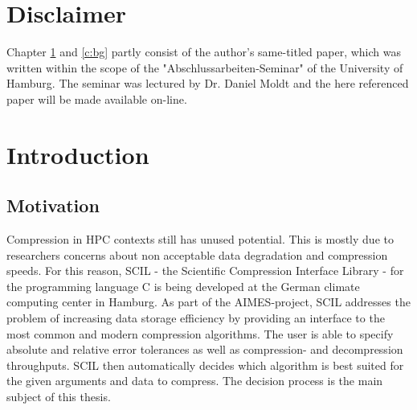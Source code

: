 \documentclass[
	12pt,
	a4paper,
	BCOR10mm,
	DIV14,
	headsepline,
]{scrreprt}
\begin{document}
\tableofcontents

\chapter*{Disclaimer}

Chapter \ref{c:intro} and \ref{c:bg} partly consist of the author's same-titled paper, which was written within the scope of the "Abschlussarbeiten-Seminar" of the University of Hamburg.
The seminar was lectured by Dr. Daniel Moldt and the here referenced paper will be made available on-line. \cite{aas} %

\chapter{Introduction}
\label{c:intro}

\section{Motivation}
\label{s:mot}


Compression in HPC contexts still has unused potential.
This is mostly due to researchers concerns about non acceptable data degradation and compression speeds. \cite{ELCC}
For this reason, SCIL - the Scientific Compression Interface Library - for the programming language C is being developed at the German climate computing center in Hamburg.
As part of the AIMES-project, SCIL addresses the problem of increasing data storage efficiency by providing an interface to the most common and modern compression algorithms. \cite{aimes}
The user is able to specify absolute and relative error tolerances as well as compression- and decompression throughputs.
SCIL then automatically decides which algorithm is best suited for the given arguments and data to compress. \cite{scil}
The decision process is the main subject of this thesis. \par
\end{document}
